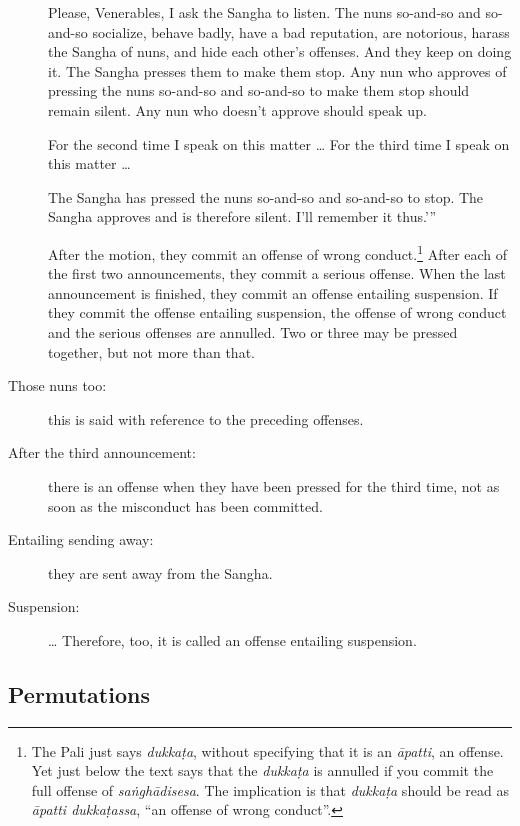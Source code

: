 \documentclass[12pt,openany]{book}%
\begin{document}
\begin{description}
Please, Venerables, I ask the Sangha to listen. The nuns so-and-so and so-and-so socialize, behave badly, have a bad reputation, are notorious, harass the Sangha of nuns, and hide each other’s offenses. And they keep on doing it. The Sangha presses them to make them stop. Any nun who approves of pressing the nuns so-and-so and so-and-so to make them stop should remain silent. Any nun who doesn’t approve should speak up. 

For the second time I speak on this matter … For the third time I speak on this matter … 

The Sangha has pressed the nuns so-and-so and so-and-so to stop. The Sangha approves and is therefore silent. I’ll remember it thus.’” 

After the motion, they commit an offense of wrong conduct.\footnote{The Pali just says \textit{\textsanskrit{dukkaṭa}}, without specifying that it is an \textit{\textsanskrit{āpatti}}, an offense. Yet just below the text says that the \textit{\textsanskrit{dukkaṭa}} is annulled if you commit the full offense of \textit{\textsanskrit{saṅghādisesa}}. The implication is that \textit{\textsanskrit{dukkaṭa}} should be read as \textit{\textsanskrit{āpatti} \textsanskrit{dukkaṭassa}}, “an offense of wrong conduct”. }  After each of the first two announcements, they commit a serious offense.  When the last announcement is finished, they commit an offense entailing suspension.  If they commit the offense entailing suspension, the offense of wrong conduct and the serious offenses are annulled. Two or three may be pressed together, but not more than that. 

%
\item[Those nuns too: ] this is said with reference to the preceding offenses. %
\item[After the third announcement: ] there is an offense when they have been pressed for the third time, not as soon as the misconduct has been committed. %
\item[Entailing sending away: ] they are sent away from the Sangha. %
\item[Suspension: ] … Therefore, too, it is called an offense entailing suspension. %
\end{description}

\subsection*{Permutations }
\end{document}
